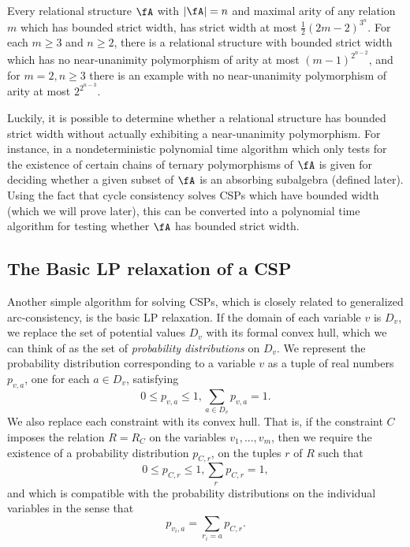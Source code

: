 \begin{thm} Every relational structure $\fA$ with $|\fA| = n$ and maximal arity of any relation $m$ which has bounded strict width, has strict width at most $\frac{1}{2}(2m-2)^{3^n}$. For each $m \ge 3$ and $n \ge 2$, there is a relational structure with bounded strict width which has no near-unanimity polymorphism of arity at most $(m-1)^{2^{n-2}}$, and for $m = 2, n \ge 3$ there is an example with no near-unanimity polymorphism of arity at most $2^{2^{n-3}}$.
\end{thm}

Luckily, it is possible to determine whether a relational structure has bounded strict width without actually exhibiting a near-unanimity polymorphism. For instance, in \cite{deciding-absorption-relational} a nondeterministic polynomial time algorithm which only tests for the existence of certain chains of ternary polymorphisms of $\fA$ is given for deciding whether a given subset of $\fA$ is an absorbing subalgebra (defined later). Using the fact that cycle consistency solves CSPs which have bounded width (which we will prove later), this can be converted into a polynomial time algorithm for testing whether $\fA$ has bounded strict width.


\subsection{The Basic LP relaxation of a CSP}\label{subsection-lp}

Another simple algorithm for solving CSPs, which is closely related to generalized arc-consistency, is the basic LP relaxation. If the domain of each variable $v$ is $D_v$, we replace the set of potential values $D_v$ with its formal convex hull, which we can think of as the set of \emph{probability distributions} on $D_v$. We represent the probability distribution corresponding to a variable $v$ as a tuple of real numbers $p_{v,a}$, one for each $a \in D_v$, satisfying
\[
0 \le p_{v,a} \le 1, \sum_{a \in D_v} p_{v,a} = 1.
\]
We also replace each constraint with its convex hull. That is, if the constraint $C$ imposes the relation $R = R_C$ on the variables $v_1, ..., v_m$, then we require the existence of a probability distribution $p_{C,r}$, on the tuples $r$ of $R$ such that
\[
0 \le p_{C,r} \le 1, \sum_r p_{C,r} = 1,
\]
and which is compatible with the probability distributions on the individual variables in the sense that
\[
p_{v_i,a} = \sum_{r_i = a} p_{C,r}.
\]

